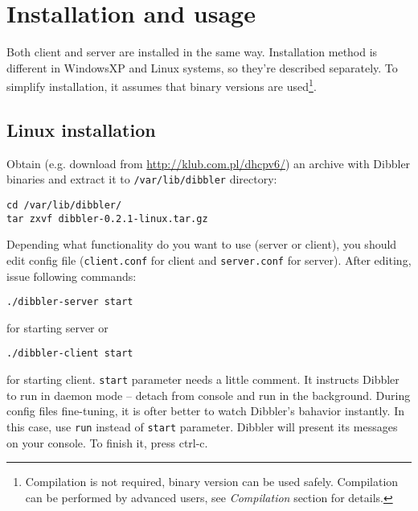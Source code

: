 
\section{Installation and usage}
Both client and server are installed in the same way. Installation
method is different in WindowsXP and Linux systems, so they're described
separately. To simplify installation, it assumes that binary versions
are used\footnote{Compilation is not
  required, binary version can be used safely. Compilation can be performed by
  advanced users, see \emph{Compilation} section for details.}.

\subsection{Linux installation}
Obtain (e.g. download from \url{http://klub.com.pl/dhcpv6/}) an archive with
Dibbler binaries and extract it to \verb+/var/lib/dibbler+ directory:
\begin{verbatim}
cd /var/lib/dibbler/
tar zxvf dibbler-0.2.1-linux.tar.gz 
\end{verbatim}

Depending what functionality do you want to use (server or client),
you should edit config file (\verb+client.conf+ for client and \verb+server.conf+
for server). After editing, issue following commands:

\begin{verbatim}
./dibbler-server start
\end{verbatim}

for starting server or

\begin{verbatim}
./dibbler-client start
\end{verbatim}

for starting client. \verb+start+ parameter needs a little comment. It
instructs Dibbler to run in daemon mode -- detach from console and run
in the background. During config files fine-tuning, it is ofter better
to watch Dibbler's bahavior instantly. In this case, use \verb+run+
instead of \verb+start+ parameter. Dibbler will present its messages on
your console. To finish it, press ctrl-c.

